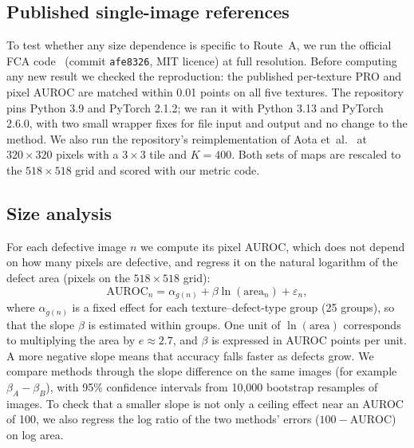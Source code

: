 \subsection{Published single-image references}
To test whether any size dependence is specific to Route~A, we run the
official FCA code~\cite{ardelean2024highfidelity} (commit \texttt{afe8326},
MIT licence) at full resolution. Before computing any new result we checked
the reproduction: the published per-texture PRO and pixel AUROC are matched
within 0.01 points on all five textures. The repository pins Python 3.9 and
PyTorch 2.1.2; we ran it with Python 3.13 and PyTorch 2.6.0, with two small
wrapper fixes for file input and output and no change to the method. We also run the repository's
reimplementation of Aota et~al.~\cite{aota2023zeroshot} at $320\times320$
pixels with a $3\times3$ tile and $K=400$. Both sets of maps are rescaled to
the $518\times518$ grid and scored with our metric code.

\subsection{Size analysis}
For each defective image $n$ we compute its pixel AUROC, which does not
depend on how many pixels are defective, and regress it on the natural
logarithm of the defect area (pixels on the $518\times518$ grid):
\begin{equation}
  \mathrm{AUROC}_n = \alpha_{g(n)} + \beta \ln(\mathrm{area}_n) + \varepsilon_n ,
  \label{eq:slope}
\end{equation}
where $\alpha_{g(n)}$ is a fixed effect for each texture--defect-type group
(25 groups), so that the slope $\beta$ is estimated within groups. One unit
of $\ln(\mathrm{area})$ corresponds to multiplying the area by $e\approx2.7$,
and $\beta$ is expressed in AUROC points per unit. A more negative slope means
that accuracy falls faster as defects grow. We compare methods through the
slope difference on the same images (for example $\beta_A-\beta_B$), with
95\% confidence intervals from 10{,}000 bootstrap resamples of images. To
check that a smaller slope is not only a ceiling effect near an AUROC of
100, we also regress the log ratio of the two methods' errors
($100-\mathrm{AUROC}$) on log area.

